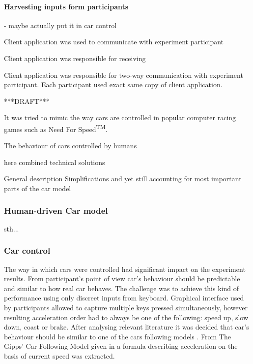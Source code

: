 \documentclass[11pt,english]{article}
\begin{document}
\paragraph{Harvesting inputs form participants} - maybe actually put it in car control



Client application was used to communicate with experiment participant

Client application was responsible for receiving 

Client application was responsible for two-way communication with experiment participant. 
Each participant used exact same copy of client application. 


***DRAFT***



It was tried to mimic the way cars are controlled in popular computer racing games such as Need For Speed\textsuperscript{TM}. 

The behaviour of cars controlled by humans 


here combined technical solutions 

General description Simplifications and yet still accounting for most important parts of
the car model


\subsubsection{Human-driven Car model}

sth...

\subsubsection*{Car control}

The way in which cars were controlled had significant impact on the experiment results. From participant's point of view car's behaviour should be predictable and similar to how real car behaves. The challenge was to achieve this kind of performance using only discreet inputs from keyboard. Graphical interface used by participants allowed to capture multiple keys pressed simultaneously, however resulting acceleration order had to always be one of the following: speed up, slow down, coast or brake. After analysing relevant literature it was decided that car's behaviour should be similar to one of the cars following models \citep{treiber2013traffic}. From The Gipps' Car Following Model given in \citet{spyropoulou2007simulation} a formula describing acceleration on the basis of current speed was extracted.
\end{document}
